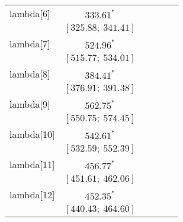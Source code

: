 \begin{table}
\begin{center}
\begin{tabular}{l c c c c c }
lambda[6]   & $333.61^{*}$                     &                           &                           &                         &                         \\
            & $[325.88;\ 341.41]$              &                           &                           &                         &                         \\
lambda[7]   & $524.96^{*}$                     &                           &                           &                         &                         \\
            & $[515.77;\ 534.01]$              &                           &                           &                         &                         \\
lambda[8]   & $384.41^{*}$                     &                           &                           &                         &                         \\
            & $[376.91;\ 391.38]$              &                           &                           &                         &                         \\
lambda[9]   & $562.75^{*}$                     &                           &                           &                         &                         \\
            & $[550.75;\ 574.45]$              &                           &                           &                         &                         \\
lambda[10]  & $542.61^{*}$                     &                           &                           &                         &                         \\
            & $[532.59;\ 552.39]$              &                           &                           &                         &                         \\
lambda[11]  & $456.77^{*}$                     &                           &                           &                         &                         \\
            & $[451.61;\ 462.06]$              &                           &                           &                         &                         \\
lambda[12]  & $452.35^{*}$                     &                           &                           &                         &                         \\
            & $[440.43;\ 464.60]$              &                           &                           &                         &                         \\

\end{tabular}
\end{center}
\end{table}
